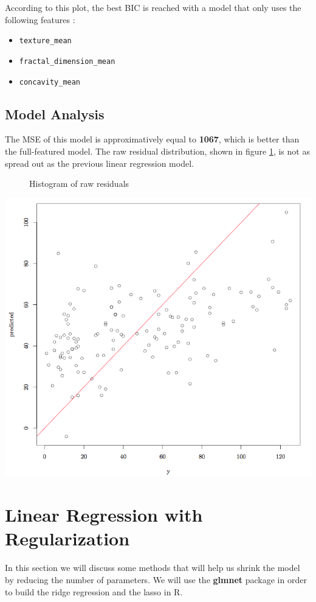 \documentclass[]{report}
\newcommand{\inputtikz}[2]{%
	\scalebox{#1}{}  
}
\begin{document}
According to this plot, the best BIC is reached with a model that only uses the following features : 
\begin{itemize}
	\item \texttt{texture\_mean}
	\item \texttt{fractal\_dimension\_mean}
	\item \texttt{concavity\_mean}
\end{itemize}

\subsection{Model Analysis}
The MSE of this model is approximatively equal to \textbf{1067}, which is better than the full-featured model. The raw residual distribution, shown in figure \ref{fig:subset_hist}, is not as spread out as the previous linear regression model.

\begin{figure}[!h]
	\centering
	\inputtikz{0.5}{Figures/subset_hist.tex}
	\caption{Histogram of raw residuals}
	\label{fig:subset_hist}
\end{figure}

\begin{center}
	\includegraphics[width=0.8\linewidth]{Figures/subset_predicted}
	\label{fig:subset_predicted}
\end{center}



\section{Linear Regression with Regularization}
In this section we will discuss some methods that will help us shrink the model by reducing the number of parameters.
We will use the \textbf{glmnet} package in order to build the ridge regression and the lasso in R.
\end{document}
